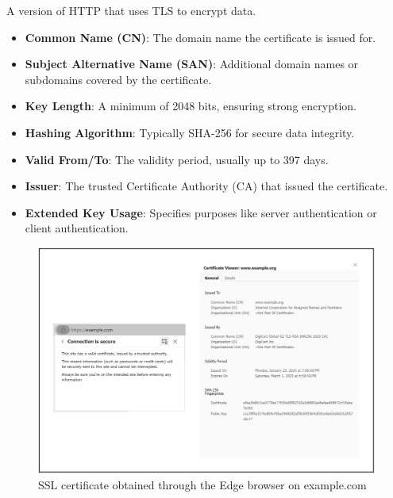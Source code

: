 \begin{Def}

    A version of HTTP that uses TLS to encrypt data.
\end{Def}


\newpage 
\begin{Def}

    \begin{itemize}
        \item \textbf{Common Name (CN)}: The domain name the certificate is issued for.
        \item \textbf{Subject Alternative Name (SAN)}: Additional domain names or subdomains covered by the certificate.
        \item \textbf{Key Length}: A minimum of 2048 bits, ensuring strong encryption.
        \item \textbf{Hashing Algorithm}: Typically SHA-256 for secure data integrity.
        \item \textbf{Valid From/To}: The validity period, usually up to 397 days.
        \item \textbf{Issuer}: The trusted Certificate Authority (CA) that issued the certificate.
        \item \textbf{Extended Key Usage}: Specifies purposes like server authentication or client authentication.
    \end{itemize}
    \hfill \cite{kinsta_tls_ssl}
\end{Def}

\begin{figure}[h!]
    \centering
    \includegraphics[width=1\textwidth]{Sections/sec/cert.png}
    \caption{SSL certificate obtained through the Edge browser on example.com}
    \label{fig:cert}
\end{figure}






